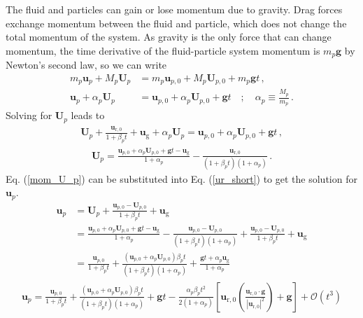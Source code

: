 The fluid and particles can gain or lose momentum due to gravity. Drag forces exchange momentum between the fluid and particle, which does not change the total momentum of the system. As gravity is the only force that can change momentum, the time derivative of the fluid-particle system momentum is $m_p \mathbf{g}$ by Newton's second law, so we can write
\begin{align}
    m_p \mathbf{u}_p + M_p \mathbf{U}_p &= m_p \mathbf{u}_{p,0} + M_p \mathbf{U}_{p,0} + m_p \mathbf{g} t \,, \\
    \label{part_mom_cons}
    \mathbf{u}_p + \alpha_p \mathbf{U}_p &= \mathbf{u}_{p,0} + \alpha_p \mathbf{U}_{p,0} + \mathbf{g} t \quad ; \quad \alpha_p \equiv \frac{M_p}{m_p} \,.
\end{align}
Solving for $\mathbf{U}_p$ leads to
\begin{align*}
    \mathbf{U}_p + \frac{\mathbf{u}_{\text{r},0}}{1 + \beta_p t} + \mathbf{u}_\text{g} + \alpha_p \mathbf{U}_p = \mathbf{u}_{p,0} + \alpha_p \mathbf{U}_{p,0} + \mathbf{g} t \,,
\end{align*}
\begin{align}
    \label{mom_U_p}
    \mathbf{U}_p = \frac{\mathbf{u}_{p,0} + \alpha_p \mathbf{U}_{p,0} + \mathbf{g} t - \mathbf{u}_\text{g}}{1 + \alpha_p} - \frac{\mathbf{u}_{\text{r},0}}{(1 + \beta_p t)(1 + \alpha_p)} \,.
\end{align}
Eq. (\ref{mom_U_p}) can be substituted into Eq. (\ref{ur_short}) to get the solution for $\mathbf{u}_p$.
\begin{align*}
    \mathbf{u}_p &= \mathbf{U}_p + \frac{\mathbf{u}_{p,0} - \mathbf{U}_{p,0}}{1 + \beta_p t} + \mathbf{u}_\text{g} \\
    &= \frac{\mathbf{u}_{p,0} + \alpha_p \mathbf{U}_{p,0} + \mathbf{g} t - \mathbf{u}_\text{g}}{1 + \alpha_p} - \frac{\mathbf{u}_{p,0} - \mathbf{U}_{p,0}}{(1 + \beta_p t)(1 + \alpha_p)} + \frac{\mathbf{u}_{p,0} - \mathbf{U}_{p,0}}{1 + \beta_p t} + \mathbf{u}_\text{g} \\
    &= \frac{\mathbf{u}_{p,0}}{1 + \beta_p t} + \frac{(\mathbf{u}_{p,0} + \alpha_p \mathbf{U}_{p,0})\beta_p t}{(1 + \beta_p t)(1 + \alpha_p)} + \frac{\mathbf{g} t + \alpha_p \mathbf{u}_\text{g}}{1 + \alpha_p}
\end{align*}
\begin{align}
    \label{mom_u_p_full}
    \mathbf{u}_p = \frac{\mathbf{u}_{p,0}}{1 + \beta_p t} + \frac{(\mathbf{u}_{p,0} + \alpha_p \mathbf{U}_{p,0})\beta_p t}{(1 + \beta_p t)(1 + \alpha_p)} + \mathbf{g} t - \frac{\alpha_p \beta_p t^2}{2 (1 + \alpha_p)} \left[\mathbf{u}_{\text{r},0} \left(\frac{\mathbf{u}_{\text{r},0} \cdot \mathbf{g}}{|\mathbf{u}_{\text{r},0}|^2}\right) + \mathbf{g}\right] + \mathcal{O}(t^3)
\end{align}
